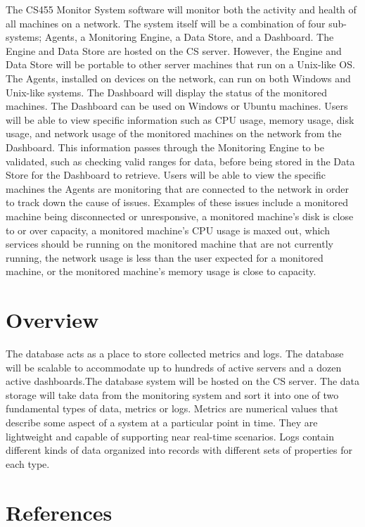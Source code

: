 \documentclass[letterpaper,12pt,oneside,listof=totoc]{scrreprt}
\begin{document}
The CS455 Monitor System software will monitor both the activity and health of all machines on a network. The system itself will be a combination of four sub-systems; Agents, a Monitoring Engine, a Data Store, and a Dashboard. The Engine and Data Store are hosted on the CS server. However, the Engine and Data Store will be portable to other server machines that run on a Unix-like OS. The Agents, installed on devices on the network, can run on both Windows and Unix-like systems. The Dashboard will display the status of the monitored machines. The Dashboard can be used on Windows or Ubuntu machines. Users will be able to view specific information such as CPU usage, memory usage, disk usage, and network usage of the monitored machines on the network from the Dashboard. This information passes through the Monitoring Engine to be validated, such as checking valid ranges for data, before being stored in the Data Store for the Dashboard to retrieve. Users will be able to view the specific machines the Agents are monitoring that are connected to the network in order to track down the cause of issues. Examples of these issues include a monitored machine being disconnected or unresponsive, a monitored machine's disk is close to or over capacity, a monitored machine's CPU usage is maxed out, which services should be running on the monitored machine that are not currently running, the network usage is less than the user expected for a monitored machine, or the monitored machine's memory usage is close to capacity. 


\section{Overview}

The database acts as a place to store collected metrics and logs. The database will be scalable to accommodate up to hundreds of active servers and a dozen active dashboards.The database system will be hosted on the CS server. The data storage will take data from the monitoring system and sort it into one of two fundamental types of data, metrics or logs. Metrics are numerical values that describe some aspect of a system at a particular point in time. They are lightweight and capable of supporting near real-time scenarios. Logs contain different kinds of data organized into records with different sets of properties for each type.
\section{References}
\end{document}
